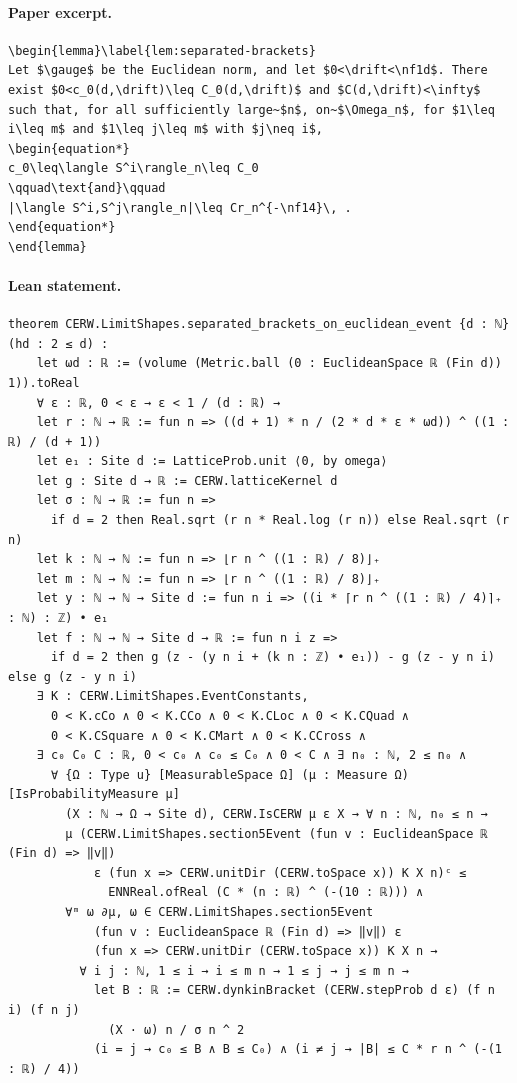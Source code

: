 \paragraph{Paper excerpt.}
\begin{verbatim}
\begin{lemma}\label{lem:separated-brackets}
Let $\gauge$ be the Euclidean norm, and let $0<\drift<\nf1d$. There exist $0<c_0(d,\drift)\leq C_0(d,\drift)$ and $C(d,\drift)<\infty$ such that, for all sufficiently large~$n$, on~$\Omega_n$, for $1\leq i\leq m$ and $1\leq j\leq m$ with $j\neq i$,
\begin{equation*}
c_0\leq\langle S^i\rangle_n\leq C_0
\qquad\text{and}\qquad
|\langle S^i,S^j\rangle_n|\leq Cr_n^{-\nf14}\, .
\end{equation*}
\end{lemma}
\end{verbatim}
\paragraph{Lean statement.}
\begin{verbatim}
theorem CERW.LimitShapes.separated_brackets_on_euclidean_event {d : ℕ} (hd : 2 ≤ d) :
    let ωd : ℝ := (volume (Metric.ball (0 : EuclideanSpace ℝ (Fin d)) 1)).toReal
    ∀ ε : ℝ, 0 < ε → ε < 1 / (d : ℝ) →
    let r : ℕ → ℝ := fun n => ((d + 1) * n / (2 * d * ε * ωd)) ^ ((1 : ℝ) / (d + 1))
    let e₁ : Site d := LatticeProb.unit ⟨0, by omega⟩
    let g : Site d → ℝ := CERW.latticeKernel d
    let σ : ℕ → ℝ := fun n =>
      if d = 2 then Real.sqrt (r n * Real.log (r n)) else Real.sqrt (r n)
    let k : ℕ → ℕ := fun n => ⌊r n ^ ((1 : ℝ) / 8)⌋₊
    let m : ℕ → ℕ := fun n => ⌊r n ^ ((1 : ℝ) / 8)⌋₊
    let y : ℕ → ℕ → Site d := fun n i => ((i * ⌈r n ^ ((1 : ℝ) / 4)⌉₊ : ℕ) : ℤ) • e₁
    let f : ℕ → ℕ → Site d → ℝ := fun n i z =>
      if d = 2 then g (z - (y n i + (k n : ℤ) • e₁)) - g (z - y n i) else g (z - y n i)
    ∃ K : CERW.LimitShapes.EventConstants,
      0 < K.cCo ∧ 0 < K.CCo ∧ 0 < K.CLoc ∧ 0 < K.CQuad ∧
      0 < K.CSquare ∧ 0 < K.CMart ∧ 0 < K.CCross ∧
    ∃ c₀ C₀ C : ℝ, 0 < c₀ ∧ c₀ ≤ C₀ ∧ 0 < C ∧ ∃ n₀ : ℕ, 2 ≤ n₀ ∧
      ∀ {Ω : Type u} [MeasurableSpace Ω] (μ : Measure Ω) [IsProbabilityMeasure μ]
        (X : ℕ → Ω → Site d), CERW.IsCERW μ ε X → ∀ n : ℕ, n₀ ≤ n →
        μ (CERW.LimitShapes.section5Event (fun v : EuclideanSpace ℝ (Fin d) => ‖v‖)
            ε (fun x => CERW.unitDir (CERW.toSpace x)) K X n)ᶜ ≤
              ENNReal.ofReal (C * (n : ℝ) ^ (-(10 : ℝ))) ∧
        ∀ᵐ ω ∂μ, ω ∈ CERW.LimitShapes.section5Event
            (fun v : EuclideanSpace ℝ (Fin d) => ‖v‖) ε
            (fun x => CERW.unitDir (CERW.toSpace x)) K X n →
          ∀ i j : ℕ, 1 ≤ i → i ≤ m n → 1 ≤ j → j ≤ m n →
            let B : ℝ := CERW.dynkinBracket (CERW.stepProb d ε) (f n i) (f n j)
              (X · ω) n / σ n ^ 2
            (i = j → c₀ ≤ B ∧ B ≤ C₀) ∧ (i ≠ j → |B| ≤ C * r n ^ (-(1 : ℝ) / 4))
\end{verbatim}
